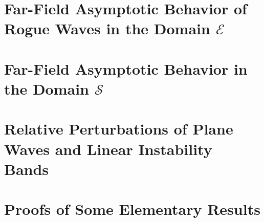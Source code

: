 \documentclass[11pt]{amsart}
\theoremstyle{definition}
\theoremstyle{remark}
\newcommand{\shelves}{\ensuremath{\mathcal{S}}}
\newcommand{\exterior}{\ensuremath{\mathcal{E}}}
\begin{document}
\section{Far-Field Asymptotic Behavior of Rogue Waves in the Domain $\exterior$}


\section{Far-Field Asymptotic Behavior in the Domain $\shelves$}


%

%
%
%
%
%
%


\newpage
\appendix
%
%
%
\section{Relative Perturbations of Plane Waves and Linear Instability Bands}
\label{A:perturbations}


\section{Proofs of Some Elementary Results}
\label{A:Proofs}

\end{document}
